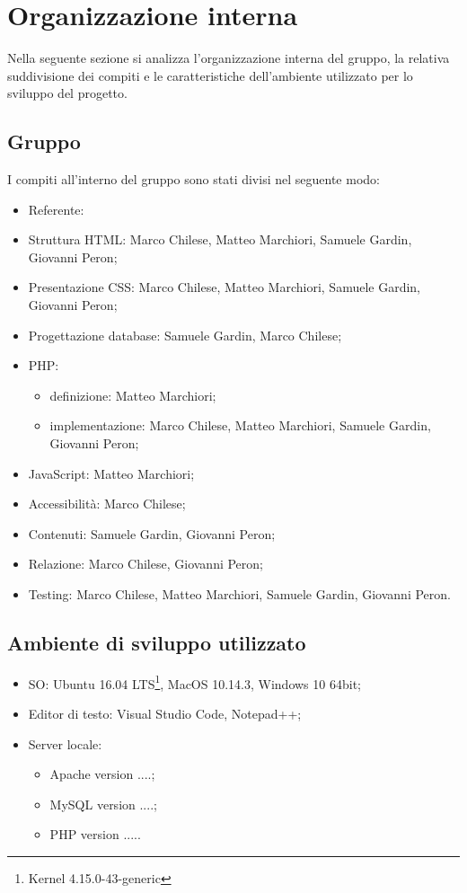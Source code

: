 \section{Organizzazione interna}
Nella seguente sezione si analizza l'organizzazione interna del gruppo, la relativa suddivisione dei compiti e le caratteristiche dell'ambiente utilizzato per lo sviluppo del progetto.
\subsection{Gruppo}
I compiti all'interno del gruppo sono stati divisi nel seguente modo:
\begin{itemize}
\item Referente:
\item Struttura HTML: Marco Chilese, Matteo Marchiori, Samuele Gardin, Giovanni Peron;
\item Presentazione CSS: Marco Chilese, Matteo Marchiori, Samuele Gardin, Giovanni Peron;
\item Progettazione database: Samuele Gardin, Marco Chilese;
\item PHP: 
\begin{itemize}
	\item definizione: Matteo Marchiori;
	\item implementazione: Marco Chilese, Matteo Marchiori, Samuele Gardin, Giovanni Peron;
\end{itemize}
\item JavaScript: Matteo Marchiori;
\item Accessibilità: Marco Chilese;
\item Contenuti: Samuele Gardin, Giovanni Peron;
\item Relazione: Marco Chilese, Giovanni Peron;
\item Testing: Marco Chilese, Matteo Marchiori, Samuele Gardin, Giovanni Peron.
\end{itemize}
\subsection{Ambiente di sviluppo utilizzato}
\begin{itemize}
	\item SO: Ubuntu 16.04 LTS\footnote{Kernel 4.15.0-43-generic}, MacOS 10.14.3, Windows 10 64bit;
	\item Editor di testo: Visual Studio Code, Notepad++;
	\item Server locale:
		\begin{itemize}
			\item Apache version ....;
			\item MySQL version ....;
			\item PHP version .....
		\end{itemize} 
\end{itemize}


